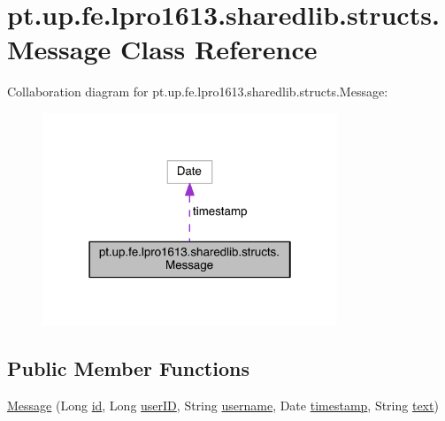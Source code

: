 \hypertarget{classpt_1_1up_1_1fe_1_1lpro1613_1_1sharedlib_1_1structs_1_1_message}{}\section{pt.\+up.\+fe.\+lpro1613.\+sharedlib.\+structs.\+Message Class Reference}
\label{classpt_1_1up_1_1fe_1_1lpro1613_1_1sharedlib_1_1structs_1_1_message}


Collaboration diagram for pt.\+up.\+fe.\+lpro1613.\+sharedlib.\+structs.\+Message\+:
\nopagebreak
\begin{figure}[H]
\begin{center}
\leavevmode
\includegraphics[width=250pt]{classpt_1_1up_1_1fe_1_1lpro1613_1_1sharedlib_1_1structs_1_1_message__coll__graph}
\end{center}
\end{figure}
\subsection*{Public Member Functions}
\begin{DoxyCompactItemize}
\item 
\hyperlink{classpt_1_1up_1_1fe_1_1lpro1613_1_1sharedlib_1_1structs_1_1_message_aef5386b1eef2600650dc0b16adf9c5f7}{Message} (Long \hyperlink{classpt_1_1up_1_1fe_1_1lpro1613_1_1sharedlib_1_1structs_1_1_message_a4a07e278bc5c3189bc9bea184f64f30f}{id}, Long \hyperlink{classpt_1_1up_1_1fe_1_1lpro1613_1_1sharedlib_1_1structs_1_1_message_a1d8ccfc6ffc283441cd73b8a915a9ac6}{user\+ID}, String \hyperlink{classpt_1_1up_1_1fe_1_1lpro1613_1_1sharedlib_1_1structs_1_1_message_a3c1e06e2767c238a3f508d5c3857f9a2}{username}, Date \hyperlink{classpt_1_1up_1_1fe_1_1lpro1613_1_1sharedlib_1_1structs_1_1_message_ab239d2ff2fc6896df1b006a4e61d2606}{timestamp}, String \hyperlink{classpt_1_1up_1_1fe_1_1lpro1613_1_1sharedlib_1_1structs_1_1_message_a34a1763aeacd9c6d6c6e80463af8ed3c}{text})
\end{DoxyCompactItemize}
